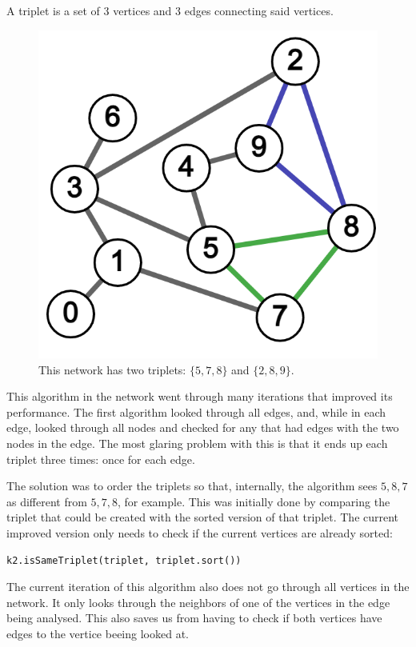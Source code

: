 A triplet is a set of 3 vertices and 3 edges connecting said vertices.
\begin{figure}[H]
  \includegraphics[width=\linewidth]{img/triplets.png}
  \caption{This network has two triplets: $\{5,7,8\}$ and $\{2,8,9\}$.}
  \label{fig:core_ex}
\end{figure}
This algorithm in the network went through many iterations that improved its performance.
The first algorithm looked through all edges, and, while in each edge,
looked through all nodes and checked for any that had edges with the two nodes in the edge.
The most glaring problem with this is that it ends up each triplet three times:
once for each edge.

The solution was to order the triplets so that, internally, the algorithm
sees $5,8,7$ as different from $5,7,8$, for example.
This was initially done by comparing the triplet that could be created
with the sorted version of that triplet.
The current improved version only needs to check if the current vertices are already sorted:
\begin{verbatim}
k2.isSameTriplet(triplet, triplet.sort())
\end{verbatim}

The current iteration of this algorithm also does not go through all vertices in the network.
It only looks through the neighbors of one of the vertices in the edge being analysed.
This also saves us from having to check if both vertices have edges to the vertice beeing looked at.

